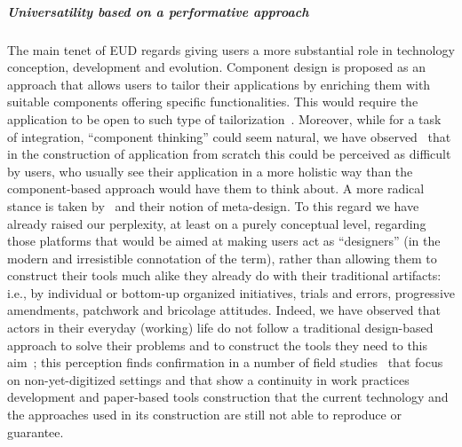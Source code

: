 \documentclass{article}
\begin{document}
\subparagraph{Universatility based on a performative approach}

The main tenet of EUD regards giving users a more substantial role in technology conception, development and evolution. Component design is proposed as an approach that allows users to tailor their applications by enriching them with suitable components offering specific functionalities. This would require the application to be open to such type of tailorization~\citep{lieberman_breaking_2006}. Moreover, while for a task of integration, ``component thinking'' could seem natural, we have observed~\citep{locatelli_community_2010} that in the construction of application from scratch this could be perceived as difficult by users, who usually see their application in a more holistic way than the component-based approach would have them to think about.
A more radical stance is taken by~\citet{fischer_meta-design:_2006} and their notion of meta-design. To this regard we have already raised our perplexity, at least on a purely conceptual level, regarding those platforms that would be aimed at making users act as ``designers'' (in the modern and irresistible connotation of the term), rather than allowing them to construct their tools much alike they already do with their traditional artifacts: i.e., by individual or bottom-up organized initiatives, trials and errors, progressive amendments, patchwork and bricolage attitudes. Indeed, we have observed that actors in their everyday (working) life do not follow a traditional design-based approach to solve their problems and to construct the tools they need to this aim~\citep{cabitza_leveraging_2012}; this perception finds confirmation in a number of field studies~\citep[e.g.,~][]{carstensen_two_1995,morrison_observing_2009,blackwell_logical_2010,handel_working_2011,morrison_multi-disciplinary_2011} that focus on non-yet-digitized settings and that show a continuity in work practices development and paper-based tools construction that the current technology and the approaches used in its construction are still not able to reproduce or guarantee.
\end{document}
